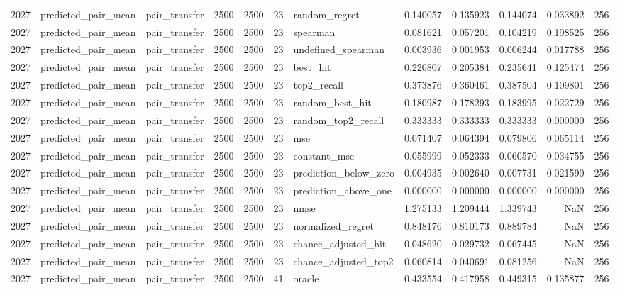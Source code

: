 \begin{tabular}{rllrrrlrrrrr}
2027 & predicted_pair_mean & pair_transfer & 2500 & 2500 & 23 & random_regret & 0.140057 & 0.135923 & 0.144074 & 0.033892 & 256 \\
2027 & predicted_pair_mean & pair_transfer & 2500 & 2500 & 23 & spearman & 0.081621 & 0.057201 & 0.104219 & 0.198525 & 256 \\
2027 & predicted_pair_mean & pair_transfer & 2500 & 2500 & 23 & undefined_spearman & 0.003936 & 0.001953 & 0.006244 & 0.017788 & 256 \\
2027 & predicted_pair_mean & pair_transfer & 2500 & 2500 & 23 & best_hit & 0.220807 & 0.205384 & 0.235641 & 0.125474 & 256 \\
2027 & predicted_pair_mean & pair_transfer & 2500 & 2500 & 23 & top2_recall & 0.373876 & 0.360461 & 0.387504 & 0.109801 & 256 \\
2027 & predicted_pair_mean & pair_transfer & 2500 & 2500 & 23 & random_best_hit & 0.180987 & 0.178293 & 0.183995 & 0.022729 & 256 \\
2027 & predicted_pair_mean & pair_transfer & 2500 & 2500 & 23 & random_top2_recall & 0.333333 & 0.333333 & 0.333333 & 0.000000 & 256 \\
2027 & predicted_pair_mean & pair_transfer & 2500 & 2500 & 23 & mse & 0.071407 & 0.064394 & 0.079806 & 0.065114 & 256 \\
2027 & predicted_pair_mean & pair_transfer & 2500 & 2500 & 23 & constant_mse & 0.055999 & 0.052333 & 0.060570 & 0.034755 & 256 \\
2027 & predicted_pair_mean & pair_transfer & 2500 & 2500 & 23 & prediction_below_zero & 0.004935 & 0.002640 & 0.007731 & 0.021590 & 256 \\
2027 & predicted_pair_mean & pair_transfer & 2500 & 2500 & 23 & prediction_above_one & 0.000000 & 0.000000 & 0.000000 & 0.000000 & 256 \\
2027 & predicted_pair_mean & pair_transfer & 2500 & 2500 & 23 & nmse & 1.275133 & 1.209444 & 1.339743 & NaN & 256 \\
2027 & predicted_pair_mean & pair_transfer & 2500 & 2500 & 23 & normalized_regret & 0.848176 & 0.810173 & 0.889784 & NaN & 256 \\
2027 & predicted_pair_mean & pair_transfer & 2500 & 2500 & 23 & chance_adjusted_hit & 0.048620 & 0.029732 & 0.067445 & NaN & 256 \\
2027 & predicted_pair_mean & pair_transfer & 2500 & 2500 & 23 & chance_adjusted_top2 & 0.060814 & 0.040691 & 0.081256 & NaN & 256 \\
2027 & predicted_pair_mean & pair_transfer & 2500 & 2500 & 41 & oracle & 0.433554 & 0.417958 & 0.449315 & 0.135877 & 256 \\

\end{tabular}
